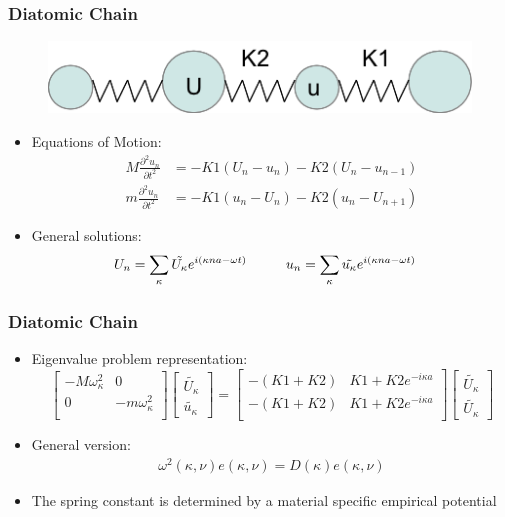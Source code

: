 \documentclass[]{beamer}
\begin{document}
\begin{frame}
  \frametitle{Diatomic Chain}   %
\begin{figure}[ht]
\centering
\includegraphics[scale=0.5]{diatomic.png}
\end{figure}
  \begin{itemize}
  \item Equations of Motion:
\begin{align*}
	M\frac{\partial ^2 u_n}{\partial t^2}&=-K1(U_n-u_n)-K2(U_n-u_{n-1})\\
	m\frac{\partial ^2 u_n}{\partial t^2}&=-K1(u_n-U_n)-K2(u_n-U_{n+1})
\end{align*}
 \item General solutions:
\begin{align*}
	U_n&=\sum_\kappa \tilde{U_\kappa}e^{i(\kappa n a-\omega t)} \hspace{10 mm}
	u_n=\sum_\kappa \tilde{u_\kappa}e^{i(\kappa n a-\omega t)}
\end{align*}
\end{itemize}
\end{frame}

\begin{frame}
  \frametitle{Diatomic Chain}   %

  \begin{itemize}
 \item Eigenvalue problem representation:
\[
\begin{bmatrix}
  -M\omega_\kappa^2 & 0\\
  0 & -m\omega_\kappa^2\\ 
 \end{bmatrix}
\begin{bmatrix}
\tilde{U_\kappa} \\ 
\tilde{u_\kappa}
\end{bmatrix}
=
\begin{bmatrix}
  -(K1+K2) & K1+K2e^{-i\kappa a}\\
  -(K1+K2) & K1+K2e^{-i\kappa a}\\ 
 \end{bmatrix}
\begin{bmatrix}
\tilde{U_\kappa} \\ \tilde{U_\kappa}
\end{bmatrix}
\]
\item General version:
  \begin{align*}
	\omega^2(\kappa,\nu) e(\kappa,\nu)=D(\kappa)e(\kappa,\nu) 
  \end{align*}
\item The spring constant is determined by a material specific empirical potential
\end{itemize}
\end{frame} 
\end{document}
